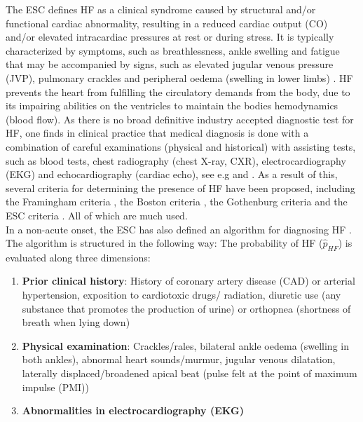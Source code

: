 \documentclass[../thesis.tex]{subfiles}
\begin{document}
\noindent The ESC defines HF as a clinical syndrome caused by structural and/or functional cardiac abnormality, resulting in a reduced cardiac output (CO) and/or elevated intracardiac pressures at rest or during stress. It is typically characterized by symptoms, such as breathlessness, ankle swelling and fatigue that may be accompanied by signs, such as elevated jugular venous pressure (JVP), pulmonary crackles and peripheral oedema (swelling in lower limbs) \citep{ponikowski2016}. HF prevents the heart from fulfilling the circulatory demands from the body, due to its impairing abilities on the ventricles to maintain the bodies hemodynamics (blood flow). As there is no broad definitive industry accepted diagnostic test for HF, one finds in clinical practice that medical diagnosis is done with a combination of careful examinations (physical and historical) with assisting tests, such as blood tests, chest radiography (chest X-ray, CXR), electrocardiography (EKG) and echocardiography (cardiac echo), see e.g \cite{henein2010heart} and \cite{son2012decision}. As a result of this, several criteria for determining the presence of HF have been proposed, including the Framingham criteria \citep{mckee1971natural}, the Boston criteria \citep{carlson1985analysis}, the Gothenburg criteria \citep{eriksson1987cardiac} and the ESC criteria \citep{swedberg2005guidelines} \citep{roger2010heart}. All of which are much used.\\
\indent In a non-acute onset, the ESC has also defined an algorithm for diagnosing HF \citep{ponikowski2016}. The algorithm is structured in the following way: The probability of HF ($\hat{p}_{HF}$) is evaluated along three dimensions: 
\begin{enumerate}[label=(\roman*)]
    \item \textbf{Prior clinical history}: History of coronary artery disease (CAD) or arterial hypertension, exposition to cardiotoxic drugs/ radiation, diuretic use (any substance that promotes the production of urine) or orthopnea (shortness of breath when lying down)
    \item \textbf{Physical examination}: Crackles/rales, bilateral ankle oedema (swelling in both ankles), abnormal heart sounds/murmur, jugular venous dilatation, laterally displaced/broadened apical beat (pulse felt at the point of maximum impulse (PMI))
    \item \textbf{Abnormalities in electrocardiography (EKG)}
\end{enumerate}
\end{document}
